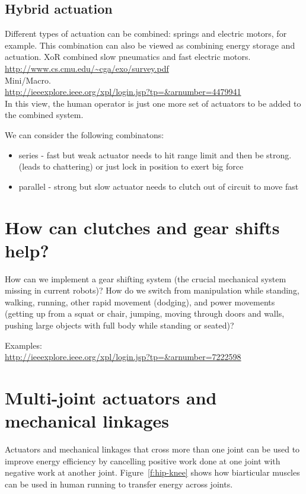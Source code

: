 \documentclass[letterpaper,12pt,fullpage]{article}
\begin{document}
\subsection{Hybrid actuation}

Different types of actuation can be combined: springs and electric motors,
for example. This combination can also be viewed as combining energy
storage and actuation. XoR combined slow pneumatics and fast electric motors.\\
\url{http://www.cs.cmu.edu/~cga/exo/survey.pdf}\\
Mini/Macro.\\
\url{http://ieeexplore.ieee.org/xpl/login.jsp?tp=&arnumber=4479941}\\
In this view, the human operator is just
one more set of actuators to be added to the combined system.

We can consider the following combinatons:
\begin{itemize}
\item
series - fast but weak actuator needs to hit range limit and then be strong. (leads to chattering) or just lock in position to exert big force
\item
parallel - strong but slow actuator needs to clutch out of circuit to move fast
\end{itemize}

\section{How can clutches and gear shifts help?}

How can we implement a gear shifting system (the crucial mechanical
system missing in current robots)? How do we switch from manipulation
while standing, walking, running, other rapid movement (dodging), and
power movements (getting up from a squat or chair,
jumping, moving through doors and walls, pushing large objects
with full body while standing or seated)?

Examples:\\
\url{http://ieeexplore.ieee.org/xpl/login.jsp?tp=&arnumber=7222598}\\

\section{Multi-joint actuators and mechanical linkages}

Actuators and mechanical linkages that cross more than one joint
can be used to improve energy efficiency by cancelling positive
work done at one joint with negative work at another joint.
Figure~\ref{f:hip-knee} shows how biarticular muscles can be used
in human running to transfer energy across joints.
\end{document}
